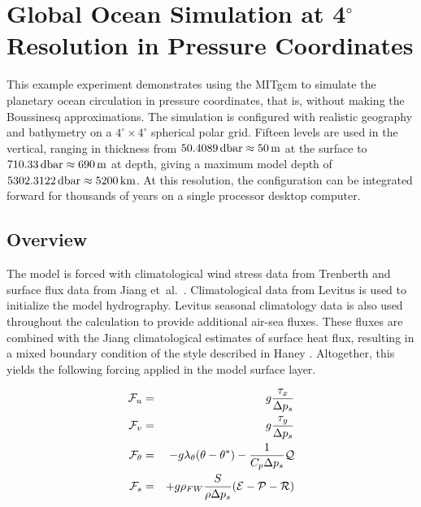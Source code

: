 
\section{Global Ocean Simulation at 4$^\circ$ Resolution in Pressure
  Coordinates}
\label{www:tutorials}
\label{sect:eg-globalpressure}


This example experiment demonstrates using the MITgcm to simulate the
planetary ocean circulation in pressure coordinates, that is, without
making the Boussinesq approximations. The simulation is configured
with realistic geography and bathymetry on a $4^{\circ} \times
4^{\circ}$ spherical polar grid.  Fifteen levels are used in the
vertical, ranging in thickness from
$50.4089\mbox{\,dbar}\approx50\mbox{\,m}$ at the surface to
$710.33\mbox{\,dbar}\approx690\mbox{\,m}$ at depth, giving a maximum
model depth of $5302.3122\mbox{\,dbar}\approx5200\mbox{\,km}$.  At
this resolution, the configuration can be integrated forward for
thousands of years on a single processor desktop computer.


\subsection{Overview}
\label{www:tutorials}

The model is forced with climatological wind stress data from
Trenberth \cite{trenberth90} and surface flux data from Jiang et~al.\ 
\cite{jiang99}. Climatological data from Levitus \cite{Levitus94} is
used to initialize the model hydrography.  Levitus seasonal
climatology data is also used throughout the calculation to provide
additional air-sea fluxes.  These fluxes are combined with the Jiang
climatological estimates of surface heat flux, resulting in a mixed
boundary condition of the style described in Haney \cite{Haney}.
Altogether, this yields the following forcing applied in the model
surface layer.

\begin{eqnarray}
\label{EQ:eg-global_forcing_pcoord}
\label{EQ:eg-global_forcing_fu_pcoord}
{\cal F}_{u} & = & g\frac{\tau_{x}}{\Delta p_{s}}
\\
\label{EQ:eg-global_forcing_fv_pcoord}
{\cal F}_{v} & = & g\frac{\tau_{y}}{\Delta p_{s}}
\\
\label{EQ:eg-global_forcing_ft_pcoord}
{\cal F}_{\theta} & = & - g\lambda_{\theta} ( \theta - \theta^{\ast} ) 
 - \frac{1}{C_{p} \Delta p_{s}}{\cal Q}
\\
\label{EQ:eg-global_forcing_fs_pcoord}
{\cal F}_{s} & = &
 + g\rho_{FW}\frac{S}{\rho\Delta p_{s}}({\cal E} - {\cal P} - {\cal R})
\end{eqnarray}

